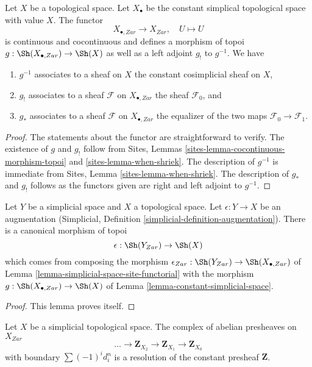 \begin{lemma}
\label{lemma-constant-simplicial-space}
Let $X$ be a topological space. Let $X_\bullet$ be the constant
simplical topological space with value $X$. The functor
$$
X_{\bullet, Zar} \longrightarrow X_{Zar},\quad
U \longmapsto U
$$
is continuous and cocontinuous and defines a morphism of
topoi $g : \Sh(X_{\bullet, Zar}) \to \Sh(X)$ as well as a left adjoint
$g_!$ to $g^{-1}$. We have
\begin{enumerate}
\item $g^{-1}$ associates to a sheaf on $X$ the constant cosimplicial
sheaf on $X$,
\item $g_!$ associates to a sheaf $\mathcal{F}$ on $X_{\bullet, Zar}$ the
sheaf $\mathcal{F}_0$, and
\item $g_*$ associates to a sheaf $\mathcal{F}$ on $X_{\bullet, Zar}$ the
equalizer of the two maps $\mathcal{F}_0 \to \mathcal{F}_1$.
\end{enumerate}
\end{lemma}

\begin{proof}
The statements about the functor are straightforward to verify.
The existence of $g$ and $g_!$ follow from
Sites, Lemmas \ref{sites-lemma-cocontinuous-morphism-topoi} and
\ref{sites-lemma-when-shriek}. The description of
$g^{-1}$ is immediate from Sites, Lemma \ref{sites-lemma-when-shriek}.
The description of $g_*$ and $g_!$ follows as the functors given are
right and left adjoint to $g^{-1}$.
\end{proof}

\begin{lemma}
\label{lemma-augmentation}
Let $Y$ be a simplicial space and $X$ a topological space.
Let $\epsilon : Y \to X$ be an augmentation
(Simplicial, Definition \ref{simplicial-definition-augmentation}).
There is a canonical morphism of topoi
$$
\epsilon : \Sh(Y_{Zar}) \to \Sh(X)
$$
which comes from composing the morphism
$\epsilon_{Zar} : \Sh(Y_{Zar}) \to \Sh(X_{\bullet, Zar})$ of
Lemma \ref{lemma-simplicial-space-site-functorial}
with the morphism $g : \Sh(X_{\bullet, Zar}) \to \Sh(X)$ of
Lemma \ref{lemma-constant-simplicial-space}.
\end{lemma}

\begin{proof}
This lemma proves itself.
\end{proof}

\begin{lemma}
\label{lemma-simplicial-resolution-Z}
Let $X$ be a simplicial topological space. The complex of
abelian presheaves on $X_{Zar}$
$$
\ldots \to \mathbf{Z}_{X_2} \to \mathbf{Z}_{X_1} \to \mathbf{Z}_{X_0}
$$
with boundary $\sum (-1)^i d^n_i$ is a resolution
of the constant presheaf $\mathbf{Z}$.
\end{lemma}

